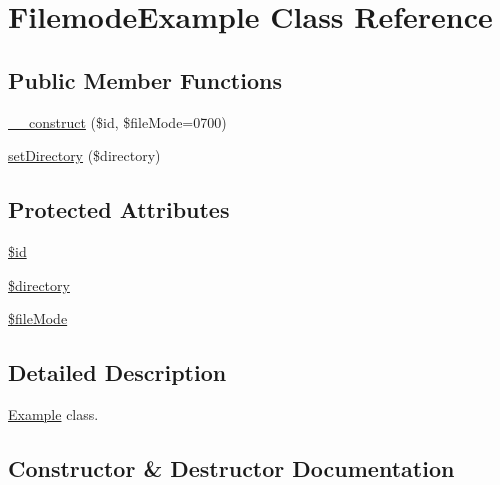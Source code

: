 \hypertarget{classorg_1_1bovigo_1_1vfs_1_1example_1_1_filemode_example}{}\section{Filemode\+Example Class Reference}
\label{classorg_1_1bovigo_1_1vfs_1_1example_1_1_filemode_example}
\subsection*{Public Member Functions}
\begin{DoxyCompactItemize}
\item 
\mbox{\hyperlink{classorg_1_1bovigo_1_1vfs_1_1example_1_1_filemode_example_acb102aa113813579613f539f35548dce}{\+\_\+\+\_\+construct}} (\$id, \$file\+Mode=0700)
\item 
\mbox{\hyperlink{classorg_1_1bovigo_1_1vfs_1_1example_1_1_filemode_example_a5eae0fee10825181e49c92c86fa71fbc}{set\+Directory}} (\$directory)
\end{DoxyCompactItemize}
\subsection*{Protected Attributes}
\begin{DoxyCompactItemize}
\item 
\mbox{\hyperlink{classorg_1_1bovigo_1_1vfs_1_1example_1_1_filemode_example_ae97941710d863131c700f069b109991e}{\$id}}
\item 
\mbox{\hyperlink{classorg_1_1bovigo_1_1vfs_1_1example_1_1_filemode_example_a1b07c630eb02f770a082a013373a16d6}{\$directory}}
\item 
\mbox{\hyperlink{classorg_1_1bovigo_1_1vfs_1_1example_1_1_filemode_example_a431f1a13132a6919120e5773c0fdb041}{\$file\+Mode}}
\end{DoxyCompactItemize}


\subsection{Detailed Description}
\mbox{\hyperlink{classorg_1_1bovigo_1_1vfs_1_1example_1_1_example}{Example}} class. 

\subsection{Constructor \& Destructor Documentation}
\mbox{\label{classorg_1_1bovigo_1_1vfs_1_1example_1_1_filemode_example_acb102aa113813579613f539f35548dce}} 
